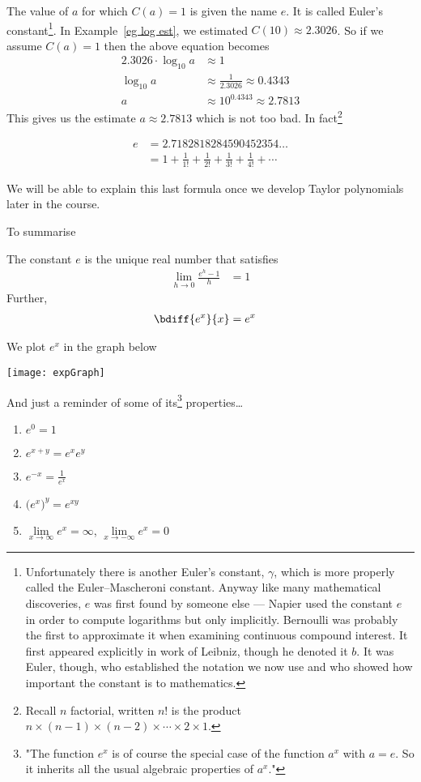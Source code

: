 The value of $a$ for which $C(a)=1$ is given the name $e$. It is called Euler's
constant\footnote{Unfortunately there is another Euler's constant, $\gamma$,
which is more properly called the  Euler--Mascheroni constant. Anyway like many
mathematical discoveries, $e$ was first found by someone else --- Napier used the
constant $e$ in order to compute logarithms but only implicitly. Bernoulli was probably
the first to approximate it when examining continuous compound interest. It first
appeared explicitly in work of Leibniz, though he denoted it $b$. It was Euler, though,
who established the notation we now use and who showed how important the constant is to
mathematics.}. %
In Example~\ref{eg log est}, we estimated $C(10)\approx 2.3026$. So if we
assume
$C(a)=1$ then the above equation becomes
\begin{align*}
  2.3026 \cdot \log_{10} a &\approx 1 \\
  \log_{10} a &\approx \frac{1}{2.3026} \approx 0.4343 \\
  a &\approx 10^{0.4343} \approx 2.7813
\end{align*}
This gives us the estimate $a \approx 2.7813$ which is not too bad. In
fact\footnote{Recall $n$ factorial, written $n!$ is the product
$n\times(n-1)\times(n-2)\times\cdots\times2\times1$.}
\begin{impeqn}\label{eq:eulerconst}
\begin{align*}
e &= 2.7182818284590452354\dots\\
  &= 1 + \frac{1}{1!} + \frac{1}{2!} + \frac{1}{3!} + \frac{1}{4!} + \cdots
\end{align*}
\end{impeqn}
We will be able to explain this last formula once we develop Taylor polynomials
later in
the course.

To summarise
\begin{theorem}\label{thm_2_7_1}
The constant $e$ is the unique real number that satisfies
\begin{align*}
	\lim_{h \to 0} \frac{e^h-1}{h} &= 1
\end{align*}
Further,
\begin{align*}
	\bdiff{e^x}{x} &= e^x
\end{align*}
\end{theorem}
We plot $e^x$ in the graph below
\begin{fig}
\begin{center}
    \texttt{[image: expGraph]}
\end{center}
\end{fig}
And just a reminder of some of its\footnote{"The function $e^x$ is of course the special
case of the function $a^x$ with $a = e$. So it inherits all the usual algebraic properties
of $a^x$."} properties\dots
\begin{enumerate}
\item $e^0=1$
\item $e^{x+y}=e^xe^y$
\item $e^{-x}=\tfrac{1}{e^x}$
\item $\big(e^x\big)^y=e^{xy}$
\item $\lim\limits_{x\rightarrow\infty}e^x=\infty$,
           $\lim\limits_{x\rightarrow-\infty}e^x=0$
\end{enumerate}

